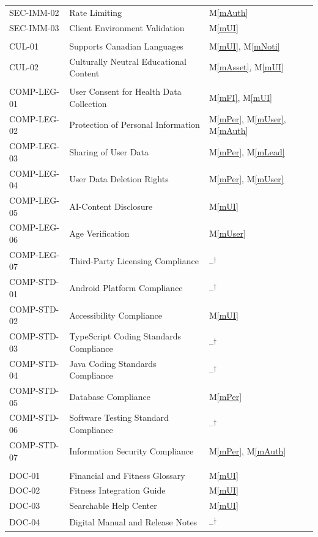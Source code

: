 \documentclass[12pt, titlepage]{article}
\newcommand{\mref}[1]{M\ref{#1}}
\begin{document}
{\begin{longtable}{>{\raggedright\arraybackslash}p{}
  >{\raggedright\arraybackslash}p{}
  >{\raggedright\arraybackslash}p{}}
SEC-IMM-02 & Rate Limiting & \mref{mAuth}\\
SEC-IMM-03 & Client Environment Validation & \mref{mUI}\\
\midrule
\multicolumn{3}{l}{\textit{Cultural Requirements}}\\
CUL-01 & Supports Canadian Languages & \mref{mUI}, \mref{mNoti}\\
CUL-02 & Culturally Neutral Educational Content & \mref{mAsset}, \mref{mUI}\\
\midrule
\multicolumn{3}{l}{\textit{Compliance Requirements}}\\
COMP-LEG-01 & User Consent for Health Data Collection & \mref{mFI}, \mref{mUI}\\
COMP-LEG-02 & Protection of Personal Information & \mref{mPer}, \mref{mUser}, \mref{mAuth}\\
COMP-LEG-03 & Sharing of User Data & \mref{mPer}, \mref{mLead}\\
COMP-LEG-04 & User Data Deletion Rights & \mref{mPer}, \mref{mUser}\\
COMP-LEG-05 & AI-Content Disclosure & \mref{mUI}\\
COMP-LEG-06 & Age Verification & \mref{mUser}\\
COMP-LEG-07 & Third-Party Licensing Compliance & --\textsuperscript{$\dagger$}\\
COMP-STD-01 & Android Platform Compliance & --\textsuperscript{$\dagger$}\\
COMP-STD-02 & Accessibility Compliance & \mref{mUI}\\
COMP-STD-03 & TypeScript Coding Standards Compliance & --\textsuperscript{$\dagger$}\\
COMP-STD-04 & Java Coding Standards Compliance & --\textsuperscript{$\dagger$}\\
COMP-STD-05 & Database Compliance & \mref{mPer}\\
COMP-STD-06 & Software Testing Standard Compliance & --\textsuperscript{$\dagger$}\\
COMP-STD-07 & Information Security Compliance & \mref{mPer}, \mref{mAuth}\\
\midrule
\multicolumn{3}{l}{\textit{Documentation Requirements}}\\
DOC-01 & Financial and Fitness Glossary & \mref{mUI}\\
DOC-02 & Fitness Integration Guide & \mref{mUI}\\
DOC-03 & Searchable Help Center & \mref{mUI}\\
DOC-04 & Digital Manual and Release Notes & --\textsuperscript{$\dagger$}\\

\end{longtable}}
\end{document}
